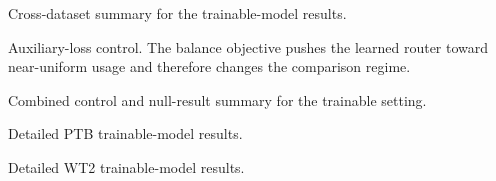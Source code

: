 \documentclass[10pt,letterpaper]{article}
\begin{document}
\begin{table}[H]
  \centering
  \caption{Cross-dataset summary for the trainable-model results.}
  \small
  
\end{table}

\begin{table}[H]
  \centering
  \caption{Auxiliary-loss control. The balance objective pushes the learned router toward near-uniform usage and therefore changes the comparison regime.}
  \small
  
\end{table}

\begin{table}[H]
  \centering
  \caption{Combined control and null-result summary for the trainable setting.}
  \small
  
\end{table}

\begin{table}[H]
  \centering
  \caption{Detailed PTB trainable-model results.}
  \small
  
\end{table}

\begin{table}[H]
  \centering
  \caption{Detailed WT2 trainable-model results.}
  \small
  
\end{table}
\end{document}
